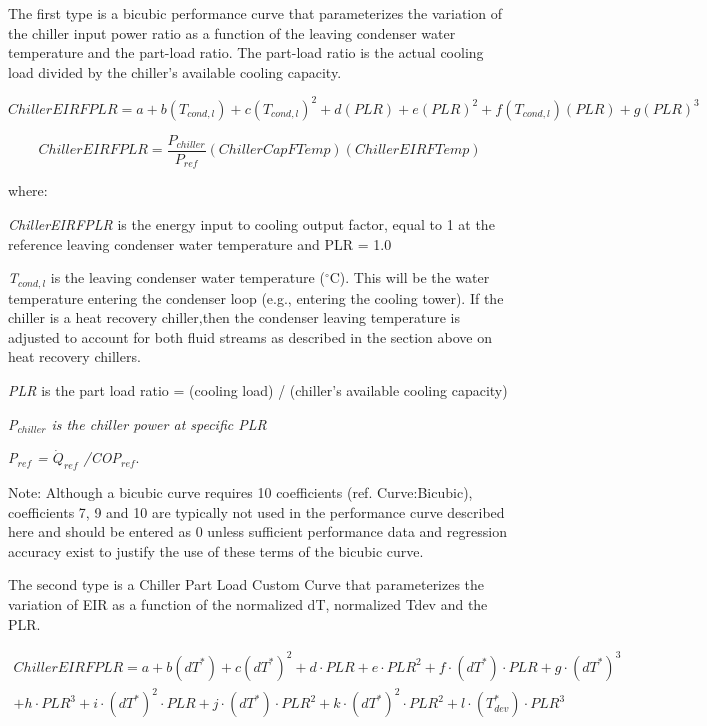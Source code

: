 The first type is a bicubic performance curve that parameterizes the variation of the chiller input power ratio as a function of the leaving condenser water temperature and the part-load ratio. The part-load ratio is the actual cooling load divided by the chiller's available cooling capacity.

\begin{equation}
ChillerEIRFPLR = a + b({T_{cond,l}}) + c{({T_{cond,l}})^2} + d(PLR) + e{(PLR)^2} + f({T_{cond,l}})(PLR) + g{(PLR)^3}
\end{equation}

\begin{equation}
  ChillerEIRFPLR = \frac{P_{chiller}}{P_{ref}}\left( {ChillerCapFTemp} \right)\left( {ChillerEIRFTemp} \right)
\end{equation}

where:

\emph{ChillerEIRFPLR} is the energy input to cooling output factor, equal to 1 at the reference leaving condenser water temperature and PLR = 1.0

\emph{T\(_{cond,l}\)} is the leaving condenser water temperature (\(^{\circ}\)C). This will be the water temperature entering the condenser loop (e.g., entering the cooling tower). If the chiller is a heat recovery chiller,then the condenser leaving temperature is adjusted to account for both fluid streams as described in the section above on heat recovery chillers.

\emph{PLR} is the part load ratio = (cooling load) / (chiller's available cooling capacity)

\emph{P\(_{chiller}\) is the chiller power at specific PLR}

\emph{P\(_{ref}\) = \({\dot{Q}_{ref}}\) /COP\(_{ref}\)}.

Note: Although a bicubic curve requires 10 coefficients (ref. Curve:Bicubic), coefficients 7, 9 and 10 are typically not used in the performance curve described here and should be entered as 0 unless sufficient performance data and regression accuracy exist to justify the use of these terms of the bicubic curve.

The second type is a Chiller Part Load Custom Curve that parameterizes the variation of EIR as a function of the normalized dT, normalized Tdev and the PLR.

\begin{equation}
\begin{split}
ChillerEIRFPLR = a + b(dT^*) + c(dT^*)^2 + d \cdot PLR + e \cdot PLR^2 + f \cdot (dT^*) \cdot PLR + g \cdot (dT^*)^3 \\
+ h \cdot PLR^3 + i \cdot (dT^*)^2 \cdot PLR + j \cdot (dT^*) \cdot PLR^2 + k \cdot (dT^*)^2 \cdot PLR^2 + l \cdot (T_{dev}^*) \cdot PLR^3
\end{split}
\end{equation}


